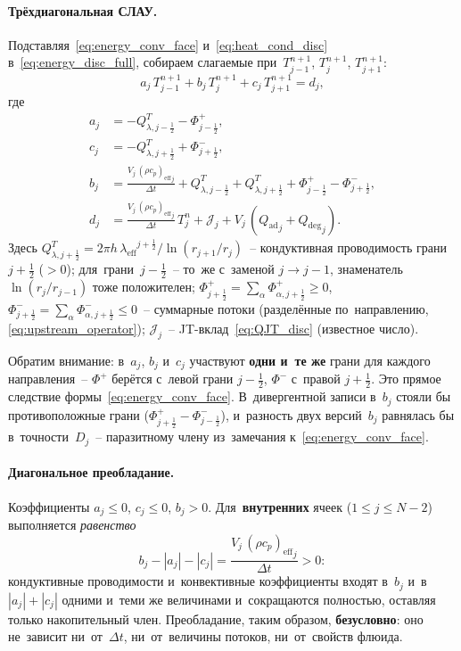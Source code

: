 \documentclass[12pt,a4paper]{article}
\newcommand{\half}{\tfrac{1}{2}}
\newcommand{\rhocpeff}{(\rho c_p)_{\mathrm{eff}}}
\newcommand{\leff}{\lambda_{\mathrm{eff}}}
\newcommand{\Qad}{Q_{\mathrm{ad}}}
\newcommand{\Qdeg}{Q_{\mathrm{deg}}}
\begin{document}
\paragraph{Трёхдиагональная СЛАУ.}
Подставляя~\eqref{eq:energy_conv_face} и~\eqref{eq:heat_cond_disc}
в~\eqref{eq:energy_disc_full}, собираем слагаемые
при~$T_{j-1}^{n+1}$, $T_j^{n+1}$, $T_{j+1}^{n+1}$:
\begin{equation}\label{eq:energy_tridiag}
  a_j\,T_{j-1}^{n+1} + b_j\,T_j^{n+1} + c_j\,T_{j+1}^{n+1} = d_j,
\end{equation}
где
\begin{align}
  a_j &= -Q_{\lambda,j-\half}^T - \Phi_{j-\half}^{+},
    \label{eq:tridiag_a} \\
  c_j &= -Q_{\lambda,j+\half}^T + \Phi_{j+\half}^{-},
    \label{eq:tridiag_c} \\
  b_j &= \frac{V_j\,{\rhocpeff}_j}{\Delta t}
    + Q_{\lambda,j-\half}^T + Q_{\lambda,j+\half}^T
    + \Phi_{j-\half}^{+} - \Phi_{j+\half}^{-},
    \label{eq:tridiag_b} \\
  d_j &= \frac{V_j\,{\rhocpeff}_j}{\Delta t}\,T_j^n
    + \mathcal{J}_j
    + V_j\,({\Qad}_j + {\Qdeg}_j).
    \label{eq:tridiag_d}
\end{align}
Здесь $Q_{\lambda,j+\half}^T = 2\pi h\,{\leff}^{j+\half}/
\ln(r_{j+1}/r_j)$~-- кондуктивная проводимость грани~$j{+}\half$ (\mbox{$>0$});
для~грани~$j{-}\half$~-- то~же с~заменой $j \to j-1$, знаменатель
$\ln(r_j/r_{j-1})$ тоже положителен;
$\Phi_{j+\half}^{+} = \sum_\alpha \Phi_{\alpha,j+\half}^+ \geqslant 0$,
$\Phi_{j+\half}^{-} = \sum_\alpha \Phi_{\alpha,j+\half}^- \leqslant 0$~--
суммарные потоки (разделённые по~направлению,
\eqref{eq:upstream_operator});
$\mathcal{J}_j$~-- JT-вклад~\eqref{eq:QJT_disc} (известное число).

Обратим внимание: в~$a_j$, $b_j$ и~$c_j$ участвуют
\textbf{одни и~те же} грани для каждого направления~--
$\Phi^{+}$ берётся с~левой грани $j{-}\half$, $\Phi^{-}$
с~правой $j{+}\half$. Это прямое следствие
формы~\eqref{eq:energy_conv_face}. В~дивергентной записи
в~$b_j$ стояли бы противоположные грани
($\Phi^{+}_{j+\half} - \Phi^{-}_{j-\half}$), и~разность двух
версий~$b_j$ равнялась бы в~точности~$D_j$~-- паразитному члену
из~замечания к~\eqref{eq:energy_conv_face}.

\paragraph{Диагональное преобладание.}
Коэффициенты $a_j \leqslant 0$, $c_j \leqslant 0$, $b_j > 0$.
Для~\textbf{внутренних} ячеек ($1 \leqslant j \leqslant N{-}2$)
выполняется \emph{равенство}
\begin{equation}\label{eq:diag_dominance}
  b_j - |a_j| - |c_j|
  = \frac{V_j\,{\rhocpeff}_j}{\Delta t} > 0 :
\end{equation}
кондуктивные проводимости и~конвективные коэффициенты входят
в~$b_j$ и~в~$|a_j| + |c_j|$ одними и~теми же величинами
и~сокращаются полностью, оставляя только накопительный член.
Преобладание, таким образом, \textbf{безусловно}: оно не~зависит
ни~от~$\Delta t$, ни~от~величины потоков, ни~от~свойств флюида.
\end{document}
